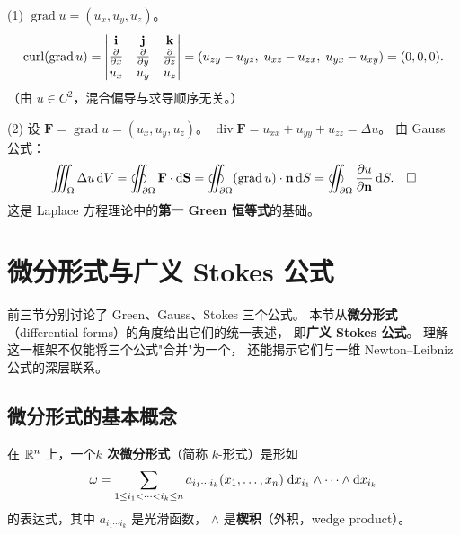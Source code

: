 \documentclass{article}
\DeclareMathOperator{\curl}{curl}
\DeclareMathOperator{\divergence}{div}
\DeclareMathOperator{\grad}{grad}
\begin{document}
\begin{solution}
  (1) $\grad u = (u_x, u_y, u_z)$。
  \[
    \curl(\grad u) =
    \begin{vmatrix} \mathbf{i} & \mathbf{j} & \mathbf{k} \\
      \pdfFrac{}{x} & \pdfFrac{}{y} & \pdfFrac{}{z} \\
      u_x & u_y & u_z
    \end{vmatrix}
    = (u_{zy}-u_{yz},\; u_{xz}-u_{zx},\; u_{yx}-u_{xy})
    = (0, 0, 0).
  \]
  （由 $u \in C^2$，混合偏导与求导顺序无关。）

  (2) 设 $\mathbf{F} = \grad u = (u_x, u_y, u_z)$。
  $\divergence\mathbf{F} = u_{xx}+u_{yy}+u_{zz} = \Delta u$。
  由 Gauss 公式：
  \[
    \iiint_\Omega \Delta u \,\dif V
    = \oiint_{\partial\Omega} \mathbf{F}\cdot\dif\mathbf{S}
    = \oiint_{\partial\Omega} (\grad u)\cdot\mathbf{n} \,\dif S
    = \oiint_{\partial\Omega} \pdfFrac{u}{\mathbf{n}} \,\dif S. \quad\square
  \]
  这是 Laplace 方程理论中的\textbf{第一 Green 恒等式}的基础。
\end{solution}


\section{微分形式与广义 Stokes 公式}

前三节分别讨论了 Green、Gauss、Stokes 三个公式。
本节从\textbf{微分形式}（differential forms）的角度给出它们的统一表述，
即\textbf{广义 Stokes 公式}。
理解这一框架不仅能将三个公式"合并"为一个，
还能揭示它们与一维 Newton--Leibniz 公式的深层联系。

\subsection{微分形式的基本概念}

\begin{definition}[$k$-形式]
  在 $\mathbb{R}^n$ 上，一个\textbf{$k$ 次微分形式}（简称 $k$-形式）是形如
  \[
    \omega = \sum_{1 \le i_1 < \cdots < i_k \le n}
    a_{i_1 \cdots i_k}(x_1, \ldots, x_n) \;
    \mathrm{d} x_{i_1} \wedge \cdots \wedge \mathrm{d} x_{i_k}
  \]
  的表达式，其中 $a_{i_1 \cdots i_k}$ 是光滑函数，
  $\wedge$ 是\textbf{楔积}（外积，wedge product）。
\end{definition}
\end{document}
